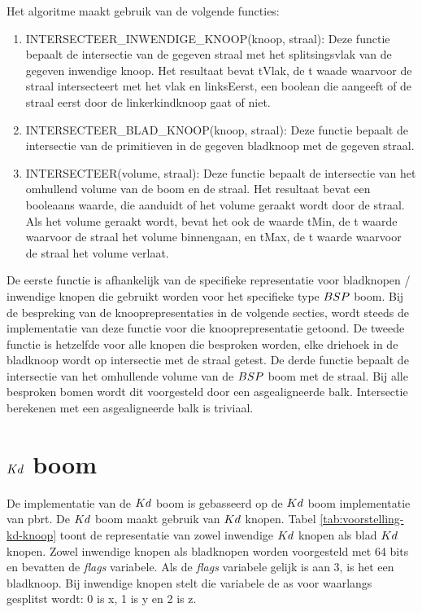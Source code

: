 Het algoritme maakt gebruik van de volgende functies:
\begin{enumerate}
    \item INTERSECTEER\_INWENDIGE\_KNOOP(knoop, straal): Deze functie bepaalt de intersectie van de gegeven straal met het splitsingsvlak van de gegeven inwendige knoop. Het resultaat bevat tVlak, de t waade waarvoor de straal intersecteert met het vlak en linksEerst, een boolean die aangeeft of de straal eerst door de linkerkindknoop gaat of niet.
    \item INTERSECTEER\_BLAD\_KNOOP(knoop, straal): Deze functie bepaalt de intersectie van de primitieven in de gegeven bladknoop met de gegeven straal.     
    \item INTERSECTEER(volume, straal): Deze functie bepaalt de intersectie van het omhullend volume van de boom en de straal. Het resultaat bevat een booleaans waarde, die aanduidt of het volume geraakt wordt door de straal. Als het volume geraakt wordt, bevat het ook de waarde tMin, de t waarde waarvoor de straal het volume binnengaan, en tMax, de t waarde waarvoor de straal het volume verlaat.
\end{enumerate}

De eerste functie is afhankelijk van de specifieke representatie voor bladknopen / inwendige knopen die gebruikt worden voor het specifieke type $BSP$ boom.
Bij de bespreking van de knooprepresentaties in de volgende secties, wordt steeds de implementatie van deze functie voor die knooprepresentatie getoond.
De tweede functie is hetzelfde voor alle knopen die besproken worden, elke driehoek in de bladknoop wordt op intersectie met de straal getest.
De derde functie bepaalt de intersectie van het omhullende volume van de $BSP$ boom met de straal. 
Bij alle besproken bomen wordt dit voorgesteld door een asgealigneerde balk.
Intersectie berekenen met een asgealigneerde balk is triviaal.

\section{$Kd$ boom}
\label{sec:h4-kd}

De implementatie van de $Kd$ boom is gebasseerd op de $Kd$ boom implementatie van pbrt.
De $Kd$ boom maakt gebruik van $Kd$ knopen. 
Tabel \ref{tab:voorstelling-kd-knoop} toont de representatie van zowel inwendige $Kd$ knopen als blad $Kd$ knopen. 
Zowel inwendige knopen als bladknopen worden voorgesteld met 64 bits en bevatten de \textit{flags} variabele.
Als de \textit{flags} variabele gelijk is aan 3, is het een bladknoop.
Bij inwendige knopen stelt die variabele de as voor waarlangs gesplitst wordt: 0 is x, 1 is y en 2 is z.
\\

